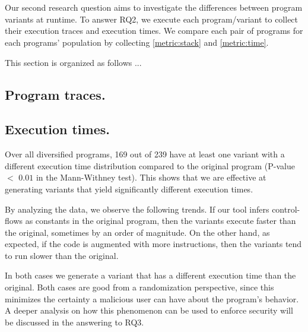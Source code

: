 \section{\rqtwo}


Our second research question aims to investigate the differences between program variants at runtime.
To answer RQ2, we execute each program/variant to collect their execution traces and execution times.
We compare each pair of programs for each programs' population by collecting \autoref{metric:stack} and \autoref{metric:time}. 

This section is organized as follows ... 

\subsection*{Program traces.}


\subsection*{Execution times.}

Over all diversified programs, 169 out of 239 have at least one variant with a different execution time distribution compared to the original program (P-value $<$ $0.01$ in the Mann-Withney test). This shows that we are effective at generating variants that yield significantly different execution times.

By analyzing the data, we observe the following trends.
If our tool infers control-flows as constants in the original program, then the variants execute faster than the original, sometimes by an order of magnitude. 
On the other hand, as expected, if the code is augmented with more instructions, then the variants tend to run slower than the original. 

In both cases we generate a variant that has a different execution time than the original. Both cases are good from a randomization perspective, since this minimizes the certainty a malicious user can have about the program's behavior. A deeper analysis on how this phenomenon can be used to enforce security will be discussed in the answering to RQ3.

